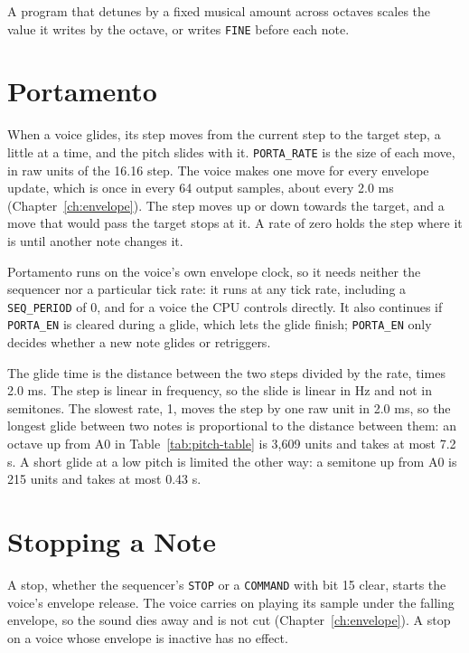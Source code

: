 A program that detunes by a fixed musical amount across octaves scales the value it writes by the octave, or writes
\texttt{FINE} before each note.

\section{Portamento}
\label{sec:portamento}

When a voice glides, its step moves from the current step to the target step, a little at a time, and the pitch slides
with it. \texttt{PORTA\_RATE} is the size of each move, in raw units of the 16.16 step. The voice makes one move for
every envelope update, which is once in every 64 output samples, about every 2.0 ms (Chapter~\ref{ch:envelope}). The
step moves up or down towards the target, and a move that would pass the target stops at it. A rate of zero holds the
step where it is until another note changes it.

Portamento runs on the voice's own envelope clock, so it needs neither the sequencer nor a particular tick rate: it
runs at any tick rate, including a \texttt{SEQ\_PERIOD} of 0, and for a voice the CPU controls directly. It also
continues if \texttt{PORTA\_EN} is cleared during a glide, which lets the glide finish; \texttt{PORTA\_EN} only decides
whether a new note glides or retriggers.

The glide time is the distance between the two steps divided by the rate, times 2.0 ms. The step is linear in
frequency, so the slide is linear in Hz and not in semitones. The slowest rate, 1, moves the step by one raw unit in
2.0 ms, so the longest glide between two notes is proportional to the distance between them: an octave up from A0 in
Table~\ref{tab:pitch-table} is 3,609 units and takes at most 7.2 s. A short glide at a low pitch is limited the other
way: a semitone up from A0 is 215 units and takes at most 0.43 s.

\section{Stopping a Note}

A stop, whether the sequencer's \texttt{STOP} or a \texttt{COMMAND} with bit 15 clear, starts the voice's envelope
release. The voice carries on playing its sample under the falling envelope, so the sound dies away and is not cut
(Chapter~\ref{ch:envelope}). A stop on a voice whose envelope is inactive has no effect.
